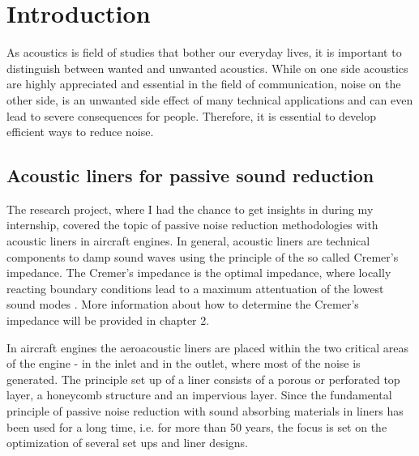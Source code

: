 \documentclass[11pt]{report} %
\begin{document}
\chapter{Introduction} 
\label{chap:Introduction}
As acoustics is field of studies that bother our everyday lives, it is important to distinguish between wanted and unwanted acoustics.
While on one side acoustics are highly appreciated and essential in the field of communication, noise on the other side, is an unwanted side effect of many technical applications and can even lead to severe consequences for people.
Therefore, it is essential to develop efficient ways to reduce noise.

\section{Acoustic liners for passive sound reduction}
The research project, where I had the chance to get insights in during my internship, covered the topic of passive noise reduction methodologies with acoustic liners in aircraft engines.
In general, acoustic liners are technical components to damp sound waves using the principle of the so called Cremer's impedance. 
The Cremer's impedance is the optimal impedance, where locally reacting boundary conditions lead to a maximum attentuation of the lowest sound modes \cite{Elnady2004}.
More information about how to determine the Cremer's impedance will be provided in chapter 2.    

In aircraft engines the aeroacoustic liners are placed within the two critical areas of the engine - in the inlet and in the outlet, where most of the noise is generated. 	 
The principle set up of a liner consists of a porous or perforated top layer, a honeycomb structure and an impervious layer. 
Since the fundamental principle of passive noise reduction with sound absorbing materials in liners has been used for a long time, i.e. for more than 50 years, the focus is set on the optimization of several set ups and liner designs.
\end{document}
